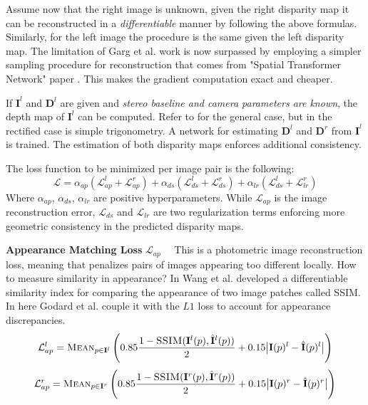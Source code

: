 Assume now that the right image is unknown, given the right disparity map it can be reconstructed in a \textit{differentiable} manner by following the above formulas.
Similarly, for the left image the procedure is the same given the left disparity map.
The limitation of Garg et al. work is now surpassed by employing a simpler sampling procedure for reconstruction that comes from "Spatial Transformer Network" paper \cite{STN}.
This makes the gradient computation exact and cheaper.

If $\mathbf{I}^{l}$ and $\mathbf{D}^{l}$ are given and \textit{stereo baseline and camera parameters are known}, the depth map of $\mathbf{I}^{l}$ can be computed.
Refer to \cite{multiview} for the general case, but in the rectified case is simple trigonometry.
A network for estimating $\mathbf{D}^{l}$ and $\mathbf{D}^{r}$ from $\mathbf{I}^{l}$ is trained.
The estimation of both disparity maps enforces additional consistency.

The loss function to be minimized per image pair is the following:
\[
	\mathcal{L} = \alpha_{ap}(\mathcal{L}_{ap}^{l} + \mathcal{L}_{ap}^{r}) +
		\alpha_{ds}(\mathcal{L}_{ds}^{l} + \mathcal{L}_{ds}^{r}) +
		\alpha_{lr}(\mathcal{L}_{ds}^{l} + \mathcal{L}_{lr}^{r}) 
\]
Where $\alpha_{ap}$, $\alpha_{ds}$, $\alpha_{lr}$ are positive hyperparameters.
While $\mathcal{L}_{ap}$ is the image reconstruction error, $\mathcal{L}_{ds}$ and $\mathcal{L}_{lr}$ are two regularization terms enforcing more geometric consistency in the predicted disparity maps.

\textbf{Appearance Matching Loss} $\mathcal{L}_{ap} \quad$ This is a photometric image reconstruction loss, meaning that penalizes pairs of images appearing too different locally.
How to measure similarity in appearance?
In \cite{SSIM} Wang et al. developed a differentiable similarity index for comparing the appearance of two image patches called \textsc{SSIM}.
In here Godard et al. couple it with the $L1$ loss to account for appearance discrepancies.
\[
	\mathcal{L}_{ap}^{l} = \textsc{Mean}_{p \in \mathbf{I}^{l}}
		\left(
			0.85 \frac{
				1 - \textsc{SSIM} (\mathbf{I}^{l}(p), \hat{\mathbf{I}}^{l}(p))
			}{2} +
			0.15 \big| \mathbf{I}(p)^{l} - \hat{\mathbf{I}}(p)^{l} \big|
		\right)
\]\[
	\mathcal{L}_{ap}^{r} = \textsc{Mean}_{p \in \mathbf{I}^{r}}
		\left(
			0.85 \frac{
				1 - \textsc{SSIM} (\mathbf{I}^{r}(p), \hat{\mathbf{I}}^{r}(p))
			}{2} +
			0.15 \big| \mathbf{I}(p)^{r} - \hat{\mathbf{I}}(p)^{r} \big|
		\right)
\]

